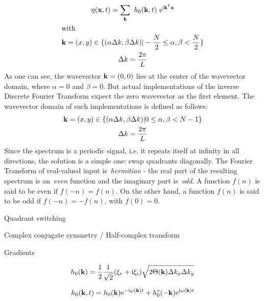 \begin{gather}
\label{eq:dft_surface_elevation}
\eta(\mathbf{x}, t) = \sum_{\mathbf{k}}~h_0(\mathbf{k},t)~\mathrm{e}^{\mathrm{i}\mathbf{k}^{\mathsf{T}}\mathbf{x}} \\
\intertext{with}
\mathbf{k} = (x,y)\in\{(\alpha\Delta k,\beta\Delta k)|
-\frac{N}{2}\leq\alpha,\beta<\frac{N}{2}\} \\
\Delta k = \frac{2\pi}{L}
\end{gather}
As one can see, the wavevector $\mathbf{k} = (0,0)$ lies at the center of the wavevector domain,
where $\alpha=0$ and $\beta=0$. But actual implementations of the inverse Discrete Fourier Transform
expect the zero wavevector as the first element. The wavevector domain of such implementations is
defined as follows:
\begin{gather}
\mathbf{k} = (x,y)\in\{(\alpha\Delta k,\beta\Delta k)|
0\leq\alpha,\beta<N-1\} \\
\Delta k = \frac{2\pi}{L}
\end{gather}
Since the spectrum is a periodic signal, i.e. it repeats itself at infinity in all directions,
the solution is a simple one: swap quadrants diagonally.
The Fourier Transform of real-valued input is~\emph{hermitian} - the real part of the resulting spectrum
is an~\emph{even} function and the imaginary part is~\emph{odd}. A function $f(n)$ is said to be even if
$f(-n) = f(n)$. On the other hand, a function $f(n)$ is said to be odd if $f(-n) = -f(n)$,
with $f(0) = 0$.


Quadrant switching

Complex conjugate symmetry / Half-complex transform

Gradients



\begin{equation}
h_0(\mathbf{k}) =
\frac{1}{2}
\frac{1}{\sqrt{2}}(\xi_r+\mathrm{i}\xi_i)
\sqrt{2\Theta(\mathbf{k})\Delta k_x \Delta k_y}
\end{equation}

\begin{equation}
 h_0(\mathbf{k}, t) =
 h_0(\mathbf{k})\mathrm{e}^{-\mathrm{i}\omega(\mathbf{k})t}
 + h_0^\ast(\mathbf{-k})\mathrm{e}^{\mathrm{i}\omega(\mathbf{k})t}
\end{equation}

